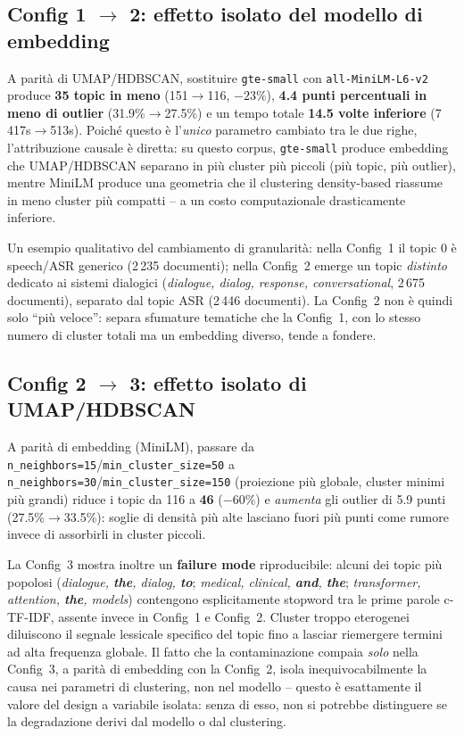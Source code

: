 \documentclass[12pt,a4paper]{article}
\begin{document}
\subsection{Config 1 $\to$ 2: effetto isolato del modello di embedding}

A parit\`a di UMAP/HDBSCAN, sostituire \texttt{gte-small} con \texttt{all-MiniLM-L6-v2} produce \textbf{35 topic in meno} (151$\to$116, $-23\%$), \textbf{4.4 punti percentuali in meno di outlier} (31.9\%$\to$27.5\%) e un tempo totale \textbf{14.5 volte inferiore} (7\,417s$\to$513s). Poich\'e questo \`e l'\emph{unico} parametro cambiato tra le due righe, l'attribuzione causale \`e diretta: su questo corpus, \texttt{gte-small} produce embedding che UMAP/HDBSCAN separano in pi\`u cluster pi\`u piccoli (pi\`u topic, pi\`u outlier), mentre MiniLM produce una geometria che il clustering density-based riassume in meno cluster pi\`u compatti -- a un costo computazionale drasticamente inferiore.

Un esempio qualitativo del cambiamento di granularit\`a: nella Config~1 il topic 0 \`e speech/ASR generico (2\,235 documenti); nella Config~2 emerge un topic \emph{distinto} dedicato ai sistemi dialogici (\textit{dialogue, dialog, response, conversational}, 2\,675 documenti), separato dal topic ASR (2\,446 documenti). La Config~2 non \`e quindi solo ``pi\`u veloce'': separa sfumature tematiche che la Config~1, con lo stesso numero di cluster totali ma un embedding diverso, tende a fondere.

\subsection{Config 2 $\to$ 3: effetto isolato di UMAP/HDBSCAN}

A parit\`a di embedding (MiniLM), passare da \texttt{n\_neighbors=15}/\texttt{min\_cluster\_size=50} a \texttt{n\_neighbors=30}/\texttt{min\_cluster\_size=150} (proiezione pi\`u globale, cluster minimi pi\`u grandi) riduce i topic da 116 a \textbf{46} ($-60\%$) e \emph{aumenta} gli outlier di 5.9 punti (27.5\%$\to$33.5\%): soglie di densit\`a pi\`u alte lasciano fuori pi\`u punti come rumore invece di assorbirli in cluster piccoli.

La Config~3 mostra inoltre un \textbf{failure mode} riproducibile: alcuni dei topic pi\`u popolosi (\textit{dialogue, \textbf{the}, dialog, \textbf{to}}; \textit{medical, clinical, \textbf{and}, \textbf{the}}; \textit{transformer, attention, \textbf{the}, models}) contengono esplicitamente stopword tra le prime parole c-TF-IDF, assente invece in Config~1 e Config~2. Cluster troppo eterogenei diluiscono il segnale lessicale specifico del topic fino a lasciar riemergere termini ad alta frequenza globale. Il fatto che la contaminazione compaia \emph{solo} nella Config~3, a parit\`a di embedding con la Config~2, isola inequivocabilmente la causa nei parametri di clustering, non nel modello -- questo \`e esattamente il valore del design a variabile isolata: senza di esso, non si potrebbe distinguere se la degradazione derivi dal modello o dal clustering.
\end{document}

